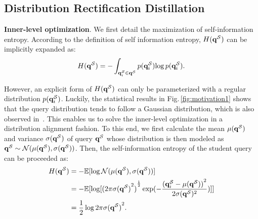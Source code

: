 \documentclass[10pt,twocolumn,letterpaper]{article}
\begin{document}
% 
% 

\subsection{Distribution Rectification Distillation}
\label{sec:DRD}

\textbf{Inner-level optimization}. 
%
%
We first detail the maximization of self-information entropy.
%
According to the definition of self information entropy, $H({\bf q}^{\mathcal{S}})$ can be implicitly expanded as:
%
\begin{equation}
    H({\bf q}^{\mathcal{S}}) = -\int_{{\bf q}^{\mathcal{S}}_i \in {\bf q}^{\mathcal{S}}} p({\bf q}^{\mathcal{S}}_i){\operatorname{log} p({\bf q}^{\mathcal{S}}_i)}.
\end{equation}
% 
% 
 
However, an explicit form of $H({\bf q}^{\mathcal{S}})$ can only be parameterized with a regular distribution $p({\bf q}^{\mathcal{S}}_i)$.
%
Luckily, the statistical results in Fig.\,\ref{fig:motivation1} shows that the query distribution tends to follow a Gaussian distribution, which is also observed in~\cite{li2022q}. This enables us to solve the inner-level optimization in a distribution alignment fashion. To this end, we first calculate the mean $\mu({\bf q}^{\mathcal{S}})$ and variance $\sigma({\bf q}^{\mathcal{S}})$ of query ${\bf q}^{\mathcal{S}}$ whose distribution is then modeled as ${\bf q}^{\mathcal{S}} \sim \mathcal{N}(\mu({\bf q}^{\mathcal{S}}), \sigma({\bf q}^{\mathcal{S}}))$. Then, the self-information entropy of the student query can be proceeded as:%
%
%
%
\begin{equation}
    \begin{aligned}
    H({\bf q}^{\mathcal{S}}) &= -\mathbb{E}[\operatorname{log} \mathcal{N}(\mu({\bf q}^{\mathcal{S}}), \sigma({\bf q}^{\mathcal{S}}))]\\
    &= -\mathbb{E}[\operatorname{log} [{(2\pi{\sigma({{\bf q}^{\mathcal{S}}})}^2)}^{\frac{1}{2}}\operatorname{exp}(-\frac{{({\bf q}^{\mathcal{S}}_i - \mu({\bf q}^{\mathcal{S}}))}^2}{2 {\sigma({{\bf q}^{\mathcal{S}}})^2}})]] \\
    &= \frac{1}{2}\operatorname{log}2\pi{\sigma({{\bf q}^{\mathcal{S}}})}^2.
    \end{aligned}
\end{equation}
\end{document}
